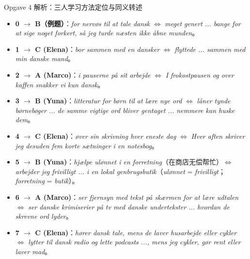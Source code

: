 \begin{tipbox}{Opgave 4 解析：三人学习方法定位与同义转述}
\small
\begin{itemize}
  \item \textbf{0 $\rightarrow$ B（例题）}：\textit{for nervøs til at tale dansk} $\Leftrightarrow$ \textit{meget genert ... bange for at sige noget forkert, så jeg turde næsten ikke åbne munden}。
  \item \textbf{1 $\rightarrow$ C (Elena)}：\textit{bor sammen med en dansker} $\Leftrightarrow$ \textit{flyttede ... sammen med min danske mand}。
  \item \textbf{2 $\rightarrow$ A (Marco)}：\textit{i pauserne på sit arbejde} $\Leftrightarrow$ \textit{I frokostpausen og over kaffen snakker vi kun dansk}。
  \item \textbf{3 $\rightarrow$ B (Yuna)}：\textit{litteratur for børn til at lære nye ord} $\Leftrightarrow$ \textit{låner tynde børnebøger ... de samme vigtige ord bliver gentaget ... nemmere kan huske dem}。
  \item \textbf{4 $\rightarrow$ C (Elena)}：\textit{øver sin skrivning hver eneste dag} $\Leftrightarrow$ \textit{Hver aften skriver jeg desuden fem korte sætninger i en notesbog}。
  \item \textbf{5 $\rightarrow$ B (Yuna)}：\textit{hjælpe ulønnet i en forretning}（在商店无偿帮忙）$\Leftrightarrow$ \textit{arbejder jeg frivilligt ... i en lokal genbrugsbutik}（\textit{ulønnet} = \textit{frivilligt}；\textit{forretning} = \textit{butik}）。
  \item \textbf{6 $\rightarrow$ A (Marco)}：\textit{ser fjernsyn med tekst på skærmen for at lære udtalen} $\Leftrightarrow$ \textit{ser danske krimiserier på tv med danske undertekster ... hvordan de skrevne ord lyder}。
  \item \textbf{7 $\rightarrow$ C (Elena)}：\textit{hører dansk tale, mens de laver husarbejde eller cykler} $\Leftrightarrow$ \textit{lytter til dansk radio og lette podcasts ..., mens jeg cykler, gør rent eller laver mad}。
\end{itemize}
\end{tipbox}

